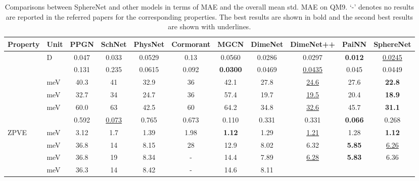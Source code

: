 \documentclass{article}
\begin{document}
\begin{table*}[t]
\centering
\caption{Comparisons between SphereNet and other models
    in terms
    of MAE and the overall mean std. MAE on QM9.
    ‘-’ denotes no results are reported in the referred papers for the corresponding properties.
    The best results are shown in bold and the
    second best results are shown with underlines.
}\label{tb:qm9}
\resizebox{\textwidth}{!}
{\begin{tabular}{llccccccccc}
\bottomrule 
Property &                                             Unit &         PPGN &                SchNet &       PhysNet &    Cormorant &   MGCN &   DimeNet  &DimeNet++ & PaiNN & \textbf{SphereNet}\\
\hline
                        &                                      D &  0.047 &           0.033 &  0.0529 &      0.13 & 0.0560&  0.0286
&  0.0297 & \textbf{0.012} &  \underline{0.0245}\\
                     &                                      &  0.131 &           0.235 &  0.0615 &    0.092 & \textbf{0.0300} & 0.0469 &  \underline{0.0435} & 0.045& 0.0449\\
       &                         meV &   40.3 &              41 &    32.9 &         36 &  42.1  & 27.8 
&  \underline{24.6} & 27.6 & \textbf{22.8}\\
       &                          meV &   32.7 &              34 &    24.7 &        36 &  57.4 &  19.7 
&  \underline{19.5} & 20.4 & \textbf{18.9}\\
             &                          meV &     60.0 &              63 &    42.5 &        60&  64.2 &  34.8 
&\underline{32.6} & 45.7 &   \textbf{31.1}\\
         &                                      &  0.592 &  \underline{0.073} &   0.765 &    0.673 &   0.110    &      0.331 &  0.331 & \textbf{0.066} & 0.268\\
ZPVE                         &                          meV &   3.12 &             1.7 &    1.39 &      1.98 & \textbf{1.12}    & 1.29
&  \underline{1.21}&1.28 &  \textbf{1.12}\\
                        &                          meV &   36.8 &              14 &    8.15 &        28&  12.9 &  8.02 
&  6.32 & \textbf{5.85}& \underline{6.26}\\
                          &                          meV &   36.8 &              19 &    8.34 &                - &  14.4 &  7.89
&  \underline{6.28} & \textbf{5.83}& 6.36\\
                          &                         meV &   36.3 &              14 &    8.42 &               - & 14.6  &  8.11

\end{tabular}}
\end{table*}
\end{document}
